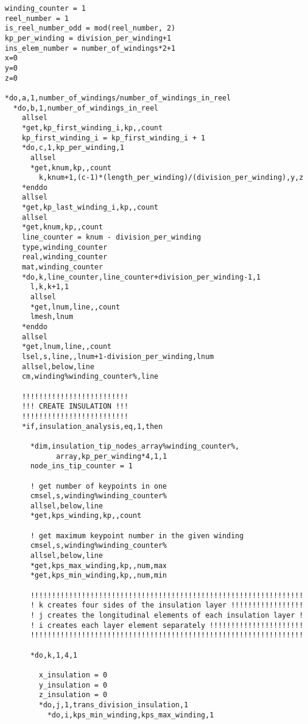 
\renewcommand{\baselinestretch}{0.8} 
\begin{verbatim}
winding_counter = 1
reel_number = 1
is_reel_number_odd = mod(reel_number, 2)
kp_per_winding = division_per_winding+1
ins_elem_number = number_of_windings*2+1
x=0
y=0
z=0

*do,a,1,number_of_windings/number_of_windings_in_reel
  *do,b,1,number_of_windings_in_reel
    allsel
    *get,kp_first_winding_i,kp,,count
    kp_first_winding_i = kp_first_winding_i + 1
    *do,c,1,kp_per_winding,1
      allsel
      *get,knum,kp,,count
        k,knum+1,(c-1)*(length_per_winding)/(division_per_winding),y,z
    *enddo
    allsel
    *get,kp_last_winding_i,kp,,count
    allsel
    *get,knum,kp,,count
    line_counter = knum - division_per_winding
    type,winding_counter
    real,winding_counter
    mat,winding_counter
    *do,k,line_counter,line_counter+division_per_winding-1,1
      l,k,k+1,1
      allsel
      *get,lnum,line,,count
      lmesh,lnum
    *enddo
    allsel
    *get,lnum,line,,count
    lsel,s,line,,lnum+1-division_per_winding,lnum
    allsel,below,line
    cm,winding%winding_counter%,line

    !!!!!!!!!!!!!!!!!!!!!!!!!
    !!! CREATE INSULATION !!!
    !!!!!!!!!!!!!!!!!!!!!!!!!
    *if,insulation_analysis,eq,1,then

      *dim,insulation_tip_nodes_array%winding_counter%,
            array,kp_per_winding*4,1,1
      node_ins_tip_counter = 1

      ! get number of keypoints in one
      cmsel,s,winding%winding_counter%
      allsel,below,line
      *get,kps_winding,kp,,count

      ! get maximum keypoint number in the given winding
      cmsel,s,winding%winding_counter%
      allsel,below,line
      *get,kps_max_winding,kp,,num,max
      *get,kps_min_winding,kp,,num,min

      !!!!!!!!!!!!!!!!!!!!!!!!!!!!!!!!!!!!!!!!!!!!!!!!!!!!!!!!!!!!!!!!
      ! k creates four sides of the insulation layer !!!!!!!!!!!!!!!!!
      ! j creates the longitudinal elements of each insulation layer !
      ! i creates each layer element separately !!!!!!!!!!!!!!!!!!!!!!
      !!!!!!!!!!!!!!!!!!!!!!!!!!!!!!!!!!!!!!!!!!!!!!!!!!!!!!!!!!!!!!!!

      *do,k,1,4,1

        x_insulation = 0
        y_insulation = 0
        z_insulation = 0
        *do,j,1,trans_division_insulation,1
          *do,i,kps_min_winding,kps_max_winding,1


\end{verbatim}
